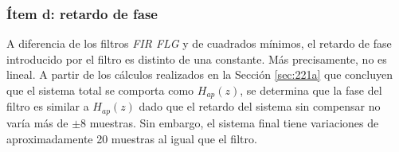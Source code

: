 
%	

\subsubsection{Ítem d: retardo de fase}


	A diferencia de los filtros \emph{FIR FLG} y de cuadrados mínimos, el retardo de fase introducido por el filtro es distinto de una constante. Más precisamente, no es lineal. A partir de los cálculos realizados en la Sección \ref{sec:221a} que concluyen que el sistema total se comporta como $H_{ap}(z)$, se determina que la fase del filtro es similar a $H_{ap}(z)$ dado que el retardo del sistema sin compensar no varía más de $\pm 8$ muestras. Sin embargo, el sistema final tiene variaciones de aproximadamente 20 muestras al igual que el filtro.
